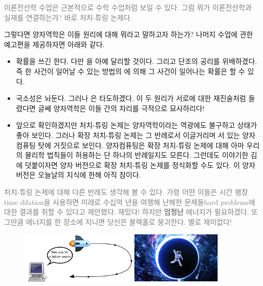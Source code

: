 \documentclass[a4paper,chapter,kosection,atbegshi,hidelinks,itemph]{oblivoir}
\begin{document}
\hfill

\hfill\parbox[t]{9cm}{\textcolor{gray}{이론전산학 수업은 근본적으로 수학 수업처럼
보일 수 있다. 그럼 뭐가 이론전산학과 실재를 연결하는가? 바로 처치-튜링 논제다.}}

\hfill\break

그렇다면 양자역학은 이들 원리에 대해 뭐라고 말하고자 하는가? 나머지 수업에 관한
예고편을 제공하자면 아래와 같다.

\hfill

\begin{itemize}[label=$\blacktriangleright$]
    \item 확률을 쓰긴 한다. 다만 을 아예
        달리할 것이다. 그리고 단조의 공리를 위배하겠다. 즉 한 사건이
        일어날 수 있는 방법의 에 의해 그 사건이 일어나는 확률은
        할 수 있다.
    \item 국소성은 놔둔다. 그러나 은 타도하겠다. 이 두
        원리가 서로에 대한 재진술처럼 들렸다면 글쎄 양자역학은 이들 간의 차리를
        극적으로 묘사하리다!
    \item 앞으로 확인하겠지만 처치-튜링 논제는 양자역학이라는 역광에도 불구하고
        상태가 좋아 보인다. 그러나 확장 처치-튜링 논제는 그 반례로서 이글거리며
        서 있는 양자컴퓨팅 탓에 거짓으로 보인다. 양자컴퓨팅은 확장 처치-튜링 
        논제에 대해 아마 우리의 물리학 법칙들이 허용하는 단 하나의 반례일지도
        모른다. 그런데도 이야기한 김에 덧붙이자면 양자 버전으로 확장 처치-튜링
        논제를 정식화할 수도 있다. 이 양자 버전은 오늘날의 지식에 한해 아직 
        참이다.
\end{itemize}

\hfill\break

\hfill\parbox[t]{9cm}{\textcolor{gray}{ 처치-튜링 논제에 대해 다른
반례도 생각해 볼 수 있다. 가령 어떤 이들은 시간 팽창{\footnotesize time 
dilation}을 사용하면 미래로 수십억 년을 여행해 난해한 문제들{\footnotesize hard
problems}에 대한 결과를 취할 수 있다고 제안했다. 재밌다! 하지만 \textbf{엄청난}
에너지가 필요하겠다. 또 그만큼 에너지를 한 장소에 지니면 당신은 블랙홀로
붕괴한다. 별로 재미없다!}}

\hfill\break

\begin{figure}[h]
    \centering
    \includegraphics[width=0.9\textwidth]{iqis1_003}
\end{figure}
\end{document}
